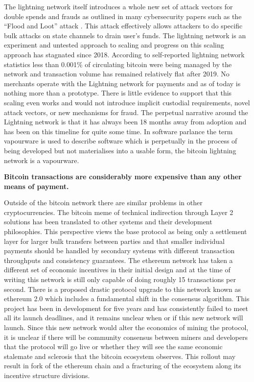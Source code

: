 
The lightning network itself introduces a whole new set of attack vectors for
double spends and frauds as outlined in many cybersecurity papers such as the
``Flood and Loot'' attack \cite{harris2020flood}.  This attack effectively
allows attackers to do specific bulk attacks on state channels to drain user's
funds. The lightning network is an experiment and untested approach to scaling
and progress on this scaling approach has stagnated since 2018. According to
self-reported lightning network statistics less than 0.001\% of circulating
bitcoin were being managed by the network and transaction volume has remained
relatively flat after 2019. No merchants operate with the Lightning network for
payments and as of today is nothing more than a prototype. There is little
evidence to support that this scaling even works and would not introduce
implicit custodial requirements, novel attack vectors, or new mechanisms for
fraud. The perpetual narrative around the Lightning network is that it has
always been 18 months away from adoption and has been on this timeline for quite
some time. In software parlance the term vapourware is used to describe software
which is perpetually in the process of being developed but not materialises into
a usable form, the bitcoin lightning network is a vapourware.

\begin{infobox}
 \textbf{ Bitcoin transactions are considerably more expensive than any other means of payment.  }
\end{infobox}

Outside of the bitcoin network there are similar problems in other
cryptocurrencies. The bitcoin meme of technical indirection through Layer 2
solutions has been translated to other systems and their development
philosophies. This perspective views the base protocol as being only a
settlement layer for larger bulk transfers between parties and that smaller
individual payments should be handled by secondary systems with different
transaction throughputs and consistency guarantees. The ethereum network has
taken a different set of economic incentives in their initial design and at the
time of writing this network is still only capable of doing roughly 15
transactions per second. There is a proposed drastic protocol upgrade to this
network known as ethereum 2.0 which includes a fundamental shift in the
consensus algorithm. This project has been in development for five years and has
consistently failed to meet all its launch deadlines, and it remains unclear when or
if this new network will launch. Since this new network would alter the
economics of mining the protocol, it is unclear if there will be community
consensus between miners and developers that the protocol will go live or
whether they will see the same economic stalemate and sclerosis that the bitcoin
ecosystem observes. This rollout may result in fork of the ethereum chain and a
fracturing of the ecosystem along its incentive structure divisions.

